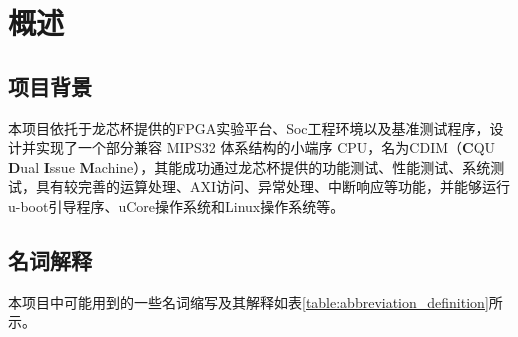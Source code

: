 \chapter{概述}

\section{项目背景}
本项目依托于龙芯杯提供的FPGA实验平台、Soc工程环境以及基准测试程序，设计并实现了一个部分兼容 MIPS32 体系结构的小端序 CPU，名为CDIM（\textbf{C}QU \textbf{D}ual \textbf{I}ssue \textbf{M}achine），其能成功通过龙芯杯提供的功能测试、性能测试、系统测试，具有较完善的运算处理、AXI访问、异常处理、中断响应等功能，并能够运行u-boot引导程序、uCore操作系统和Linux操作系统等。

\section{名词解释}
本项目中可能用到的一些名词缩写及其解释如表\ref{table:abbreviation_definition}所示。

